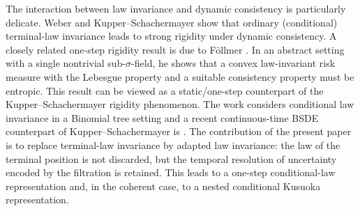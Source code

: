\documentclass[a4paper]{amsart}
\theoremstyle{definition}
\begin{document}
The interaction between law invariance and dynamic consistency is particularly
delicate. %
Weber \cite{Weber2006} and Kupper--Schachermayer
\cite{KupperSchachermayer2009} show that ordinary (conditional) terminal-law invariance
leads to strong rigidity under dynamic consistency.
A closely related one-step rigidity result is due to Föllmer
\cite[Theorem~3.4]{Follmer2014Spatial}. In an abstract setting with a
single nontrivial sub-\(\sigma\)-field, he shows that a convex law-invariant
risk measure with the Lebesgue property and a suitable consistency property
must be entropic. This result can be viewed as a static/one-step counterpart
of the Kupper--Schachermayer rigidity phenomenon.
The work \cite{Elliott2015JAP} considers conditional law invariance in a Binomial tree setting and a recent continuous-time BSDE
counterpart of Kupper--Schachermayer is \cite{BensaidDumitrescuMatoussiSabbagh2026}. The contribution of the present
paper is to replace terminal-law invariance by adapted law invariance: the law
of the terminal position is not discarded, but the temporal resolution of
uncertainty encoded by the filtration is retained. This leads to a one-step
conditional-law representation and, in the coherent case, to a nested
conditional Kusuoka representation.

\medskip
\end{document}
